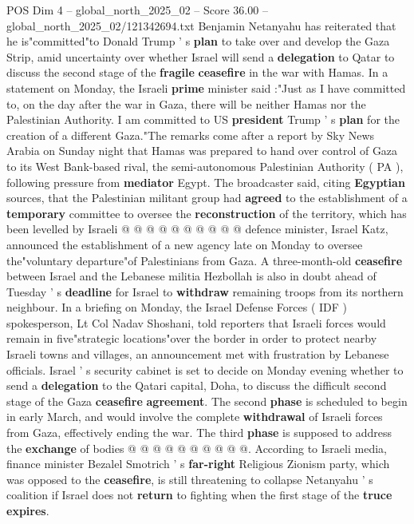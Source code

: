 \begin{textsample}{POS Dim 4 – global\_north\_2025\_02 – Score 36.00 – global\_north\_2025\_02/121342694.txt}  \label{ex:f4_pos_051}
Benjamin Netanyahu has reiterated that he is"committed"to Donald Trump ' s \textbf{plan} to take over and develop the Gaza Strip, amid uncertainty over whether Israel will send a \textbf{delegation} to Qatar to discuss the second stage of the \textbf{fragile} \textbf{ceasefire} in the war with Hamas.
In a statement on Monday, the Israeli \textbf{prime} minister said :"Just as I have committed to, on the day after the war in Gaza, there will be neither Hamas nor the Palestinian Authority.
I am committed to US \textbf{president} Trump ' s \textbf{plan} for the creation of a different Gaza."The remarks come after a report by Sky News Arabia on Sunday night that Hamas was prepared to hand over control of Gaza to its West Bank-based rival, the semi-autonomous Palestinian Authority ( PA ), following pressure from \textbf{mediator} Egypt.
The broadcaster said, citing \textbf{Egyptian} sources, that the Palestinian militant group had \textbf{agreed} to the establishment of a \textbf{temporary} committee to oversee the \textbf{reconstruction} of the territory, which has been levelled by Israeli @ @ @ @ @ @ @ @ @ @ defence minister, Israel Katz, announced the establishment of a new agency late on Monday to oversee the"voluntary departure"of Palestinians from Gaza.
A three-month-old \textbf{ceasefire} between Israel and the Lebanese militia Hezbollah is also in doubt ahead of Tuesday ' s \textbf{deadline} for Israel to \textbf{withdraw} remaining troops from its northern neighbour.
In a briefing on Monday, the Israel Defense Forces ( IDF ) spokesperson, Lt Col Nadav Shoshani, told reporters that Israeli forces would remain in five"strategic locations"over the border in order to protect nearby Israeli towns and villages, an announcement met with frustration by Lebanese officials.
Israel ' s security cabinet is set to decide on Monday evening whether to send a \textbf{delegation} to the Qatari capital, Doha, to discuss the difficult second stage of the Gaza \textbf{ceasefire} \textbf{agreement}.
The second \textbf{phase} is scheduled to begin in early March, and would involve the complete \textbf{withdrawal} of Israeli forces from Gaza, effectively ending the war.
The third \textbf{phase} is supposed to address the \textbf{exchange} of bodies @ @ @ @ @ @ @ @ @ @.
According to Israeli media, finance minister Bezalel Smotrich ' s \textbf{far-right} Religious Zionism party, which was opposed to the \textbf{ceasefire}, is still threatening to collapse Netanyahu ' s coalition if Israel does not \textbf{return} to fighting when the first stage of the \textbf{truce} \textbf{expires}.

\end{textsample}
